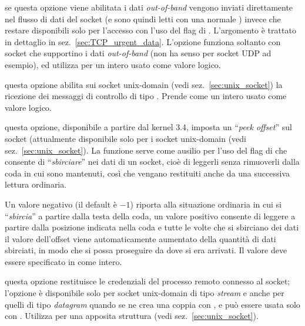 \begin{basedescript}{\desclabelwidth{2.2cm}\desclabelstyle{\nextlinelabel}}
\item[\constd{SO\_OOBINLINE}] se questa opzione viene abilitata i dati
  \textit{out-of-band} vengono inviati direttamente nel flusso di dati del
  socket (e sono quindi letti con una normale ) invece che restare
  disponibili solo per l'accesso con l'uso del flag  di
  . L'argomento è trattato in dettaglio in
  sez.~\ref{sec:TCP_urgent_data}. L'opzione funziona soltanto con socket che
  supportino i dati \textit{out-of-band} (non ha senso per socket UDP ad
  esempio), ed utilizza per  un intero usato come valore logico.

\item[\constd{SO\_PASSCRED}] questa opzione abilita sui socket unix-domain
  (vedi sez.~\ref{sec:unix_socket}) la ricezione dei messaggi di controllo di
  tipo . Prende come  un intero usato
  come valore logico.

\item[\constd{SO\_PEEK\_OFF}] questa opzione, disponibile a partire dal kernel
  3.4, imposta un ``\textit{peek offset}'' sul socket (attualmente disponibile
  solo per i socket unix-domain (vedi sez.~\ref{sec:unix_socket}). La funzione
  serve come ausilio per l'uso del flag  di  che
  consente di ``\textsl{sbirciare}'' nei dati di un socket, cioè di leggerli
  senza rimuoverli dalla coda in cui sono mantenuti, così che vengano
  restituiti anche da una successiva lettura ordinaria.
 
  Un valore negativo (il default è $-1$) riporta alla situazione ordinaria in
  cui si ``\textsl{sbircia}'' a partire dalla testa della coda, un valore
  positivo consente di leggere a partire dalla posizione indicata nella coda e
  tutte le volte che si sbirciano dei dati il valore dell'offset viene
  automaticamente aumentato della quantità di dati sbirciati, in modo che si
  possa proseguire da dove si era arrivati. Il valore deve essere specificato
  in  come intero.

\item[\constd{SO\_PEERCRED}] questa opzione restituisce le credenziali del
  processo remoto connesso al socket; l'opzione è disponibile solo per socket
  unix-domain di tipo \textit{stream} e anche per quelli di tipo
  \textit{datagram} quando se ne crea una coppia con , e può
  essere usata solo con .  Utilizza per
   una apposita struttura  (vedi
  sez.~\ref{sec:unix_socket}). 


\end{basedescript}
